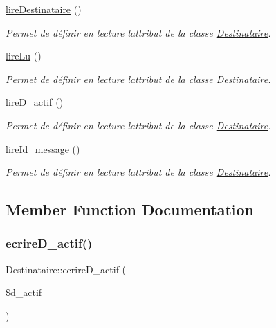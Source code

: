 \begin{DoxyCompactItemize}
\hyperlink{class_destinataire_a6ea5813438da84b4f2f2789008b251d3}{lire\+Destinataire} ()
\begin{DoxyCompactList}\small\item\em Permet de définir en lecture l\textquotesingle{}attribut de la classe \hyperlink{class_destinataire}{Destinataire}. \end{DoxyCompactList}\item 
\hyperlink{class_destinataire_a22817a50de7a500114468dd34a3da1a2}{lire\+Lu} ()
\begin{DoxyCompactList}\small\item\em Permet de définir en lecture l\textquotesingle{}attribut de la classe \hyperlink{class_destinataire}{Destinataire}. \end{DoxyCompactList}\item 
\hyperlink{class_destinataire_a560a64eedd2e2cd7fac6cfe704a1a83c}{lire\+D\+\_\+actif} ()
\begin{DoxyCompactList}\small\item\em Permet de définir en lecture l\textquotesingle{}attribut de la classe \hyperlink{class_destinataire}{Destinataire}. \end{DoxyCompactList}\item 
\hyperlink{class_destinataire_adfd6ed497eb752f688aa4de52cd06704}{lire\+Id\+\_\+message} ()
\begin{DoxyCompactList}\small\item\em Permet de définir en lecture l\textquotesingle{}attribut de la classe \hyperlink{class_destinataire}{Destinataire}. \end{DoxyCompactList}\end{DoxyCompactItemize}


\subsection{Member Function Documentation}
\mbox{\label{class_destinataire_a41d03af12ef66b01520db7cf86c08f6a}} 
\subsubsection{\texorpdfstring{ecrire\+D\+\_\+actif()}{ecrireD\_actif()}}
{\footnotesize\ttfamily Destinataire\+::ecrire\+D\+\_\+actif (\begin{DoxyParamCaption}\item[{}]{\$d\+\_\+actif }\end{DoxyParamCaption})}



